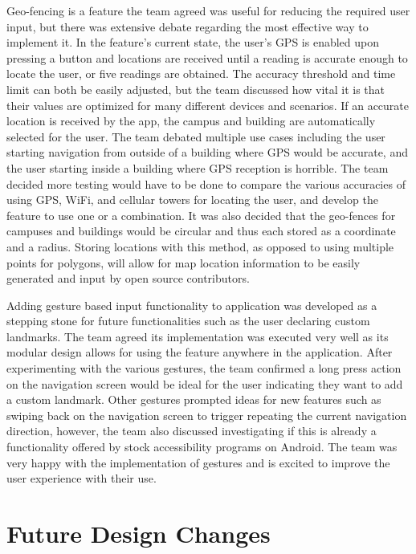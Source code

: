 \documentclass{scrreprt}
\begin{document}
Geo-fencing is a feature the team agreed was useful for reducing the required user input, but there was extensive debate regarding the most effective way to implement it. In the feature’s current state, the user's GPS is enabled upon pressing a button and locations are received until a reading is accurate enough to locate the user, or five readings are obtained. The accuracy threshold and time limit can both be easily adjusted, but the team discussed how vital it is that their values are optimized for many different devices and scenarios. If an accurate location is received by the app, the campus and building are automatically selected for the user. The team debated multiple use cases including the user starting navigation from outside of a building where GPS would be accurate, and the user starting inside a building where GPS reception is horrible. The team decided more testing would have to be done to compare the various accuracies of using GPS, WiFi, and cellular towers for locating the user, and develop the feature to use one or a combination. It was also decided that the geo-fences for campuses and buildings would be circular and thus each stored as a coordinate and a radius. Storing locations with this method, as opposed to using multiple points for polygons, will allow for map location information to be easily generated and input by open source contributors.

Adding gesture based input functionality to application was developed as a stepping stone for future functionalities such as the user declaring custom landmarks. The team agreed its implementation was executed very well as its modular design allows for using the feature anywhere in the application. After experimenting with the various gestures, the team confirmed a long press action on the navigation screen would be ideal for the user indicating they want to add a custom landmark. Other gestures prompted ideas for new features such as swiping back on the navigation screen to trigger repeating the current navigation direction, however, the team also discussed investigating if this is already a functionality offered by stock accessibility programs on Android. The team was very happy with the implementation of gestures and is excited to improve the user experience with their use.

\chapter{Future Design Changes}
\end{document}
